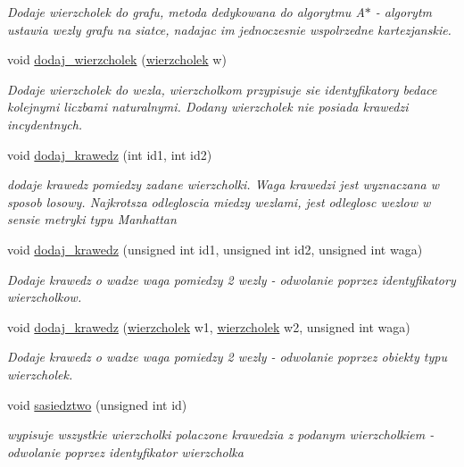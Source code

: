 \begin{DoxyCompactItemize}
\begin{DoxyCompactList}\small\item\em Dodaje wierzcholek do grafu, metoda dedykowana do algorytmu A$\ast$ -\/ algorytm ustawia wezly grafu na siatce, nadajac im jednoczesnie wspolrzedne kartezjanskie. \end{DoxyCompactList}\item 
void \hyperlink{classgraf_abe2f98850133e73015ab8232d90d7530}{dodaj\-\_\-wierzcholek} (\hyperlink{classwierzcholek}{wierzcholek} w)
\begin{DoxyCompactList}\small\item\em Dodaje wierzcholek do wezla, wierzcholkom przypisuje sie identyfikatory bedace kolejnymi liczbami naturalnymi. Dodany wierzcholek nie posiada krawedzi incydentnych. \end{DoxyCompactList}\item 
void \hyperlink{classgraf_a815e60a2e34a99d498f3345b15d678b7}{dodaj\-\_\-krawedz} (int id1, int id2)
\begin{DoxyCompactList}\small\item\em dodaje krawedz pomiedzy zadane wierzcholki. Waga krawedzi jest wyznaczana w sposob losowy. Najkrotsza odlegloscia miedzy wezlami, jest odleglosc wezlow w sensie metryki typu Manhattan \end{DoxyCompactList}\item 
void \hyperlink{classgraf_af263156c2af2d8d2ec0d7ff0ee3dd9af}{dodaj\-\_\-krawedz} (unsigned int id1, unsigned int id2, unsigned int waga)
\begin{DoxyCompactList}\small\item\em Dodaje krawedz o wadze waga pomiedzy 2 wezly -\/ odwolanie poprzez identyfikatory wierzcholkow. \end{DoxyCompactList}\item 
void \hyperlink{classgraf_a8442b7d095a21024666b12c3e3f4184b}{dodaj\-\_\-krawedz} (\hyperlink{classwierzcholek}{wierzcholek} w1, \hyperlink{classwierzcholek}{wierzcholek} w2, unsigned int waga)
\begin{DoxyCompactList}\small\item\em Dodaje krawedz o wadze waga pomiedzy 2 wezly -\/ odwolanie poprzez obiekty typu wierzcholek. \end{DoxyCompactList}\item 
void \hyperlink{classgraf_a6a3ee98f332805da9c65749bacad27db}{sasiedztwo} (unsigned int id)
\begin{DoxyCompactList}\small\item\em wypisuje wszystkie wierzcholki polaczone krawedzia z podanym wierzcholkiem -\/ odwolanie poprzez identyfikator wierzcholka \end{DoxyCompactList}\item 

\end{DoxyCompactItemize}
